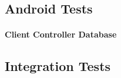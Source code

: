 	
	
	
	
	

\subsection{Android Tests}

	\paragraph{Client Controller Database}

\subsection{Integration Tests}


